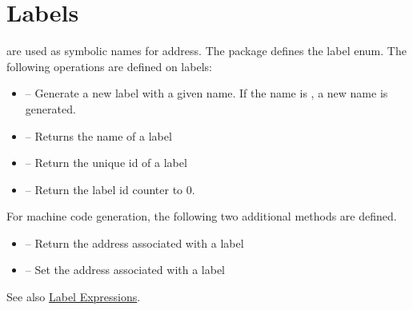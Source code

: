 \section{Labels}

 are used as symbolic names for address.
The package 
defines the label enum.  The following operations are defined
on labels:
\begin{itemize}
\item {} --  Generate a new label with
    a given name.  If the name is , a new name is generated.
\item {} -- Returns the name of
   a label
\item {} -- Return the unique id of a label
\item {} -- Return the label id counter to 0.  
\end{itemize}

For machine code generation, the following two additional methods are
defined.
\begin{itemize}
\item  {} -- Return the address associated with
a label
\item  {} --  Set the address associated
with a label
\end{itemize}

See also \href{labelexp.html}{Label Expressions}.
